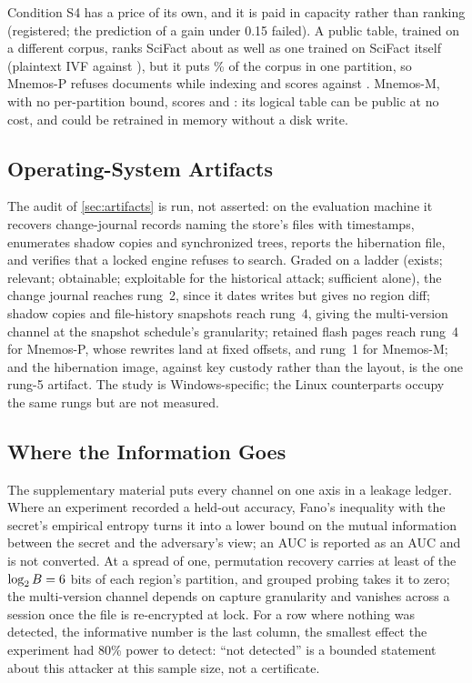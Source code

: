 Condition S4 has a price of its own, and it is paid in capacity rather than ranking (registered; the
prediction of a gain under 0.15 failed). A public table, trained on a
different corpus, ranks SciFact about as well as one trained on SciFact itself (plaintext IVF
\REtwentyfourIvfPub{} against \REtwentyfourIvfOwn), but it puts \REtwentyfourShare\% of the corpus
in one partition, so Mnemos-P refuses \REtwentyfourRefusedPub{} documents while indexing and scores
\REtwentyfourPPub{} against \REtwentyfourPOwn. Mnemos-M, with no per-partition bound, scores
\REtwentyfourMPub{} and \REtwentyfourMOwn: its logical table can be public at no cost, and could be
retrained in memory without a disk write.

\subsection{Operating-System Artifacts}
\label{sec:eval-artifacts}

The audit of \cref{sec:artifacts} is run, not asserted: on the evaluation machine it recovers
change-journal records naming the store's files with timestamps, enumerates shadow copies and
synchronized trees, reports the hibernation file, and verifies that a locked engine refuses to
search. Graded on a ladder (exists; relevant; obtainable; exploitable for the historical attack;
sufficient alone), the change journal reaches rung~2, since it dates writes but gives no region
diff; shadow copies and file-history snapshots reach rung~4, giving the multi-version channel at the
snapshot schedule's granularity; retained flash pages reach rung~4 for Mnemos-P, whose rewrites land
at fixed offsets, and rung~1 for Mnemos-M; and the hibernation image, against key custody rather
than the layout, is the one rung-5 artifact. The study is Windows-specific; the Linux counterparts
occupy the same rungs but are not measured.

\subsection{Where the Information Goes}
\label{sec:eval-ledger}

The supplementary material puts every channel on one axis in a leakage ledger. Where an experiment recorded a held-out accuracy,
Fano's inequality with the secret's empirical entropy turns it into a lower bound on the mutual
information between the secret and the adversary's view; an AUC is reported as an AUC and is not
converted. At a spread of one, permutation recovery carries at least \RLedgerPermBits{} of the
$\log_2 B = 6$ bits of each region's partition, and grouped probing takes it to
zero; the multi-version channel depends on capture granularity and vanishes across a session once
the file is re-encrypted at lock. For a row where nothing was detected, the informative number is
the last column, the smallest effect the experiment had 80\% power to detect: ``not detected'' is a
bounded statement about this attacker at this sample size, not a certificate.
